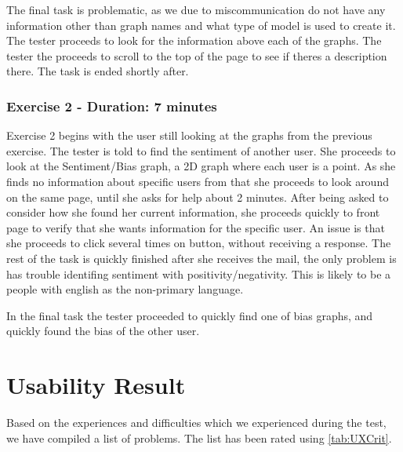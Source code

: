 The final task is problematic, as we due to miscommunication do not have any
information other than graph names and what type of model is used to create it.
The tester proceeds to look for the information above each of the graphs. The
tester the proceeds to scroll to the top of the page to see if theres a
description there. The task is ended shortly after.

\subsubsection{Exercise 2 - Duration: 7 minutes}
Exercise 2 begins with the user still looking at the graphs from the previous
exercise. The tester is told to find the sentiment of another user. She proceeds
to look at the Sentiment/Bias graph, a 2D graph where each user is a point. As
she finds no information about specific users from that she proceeds to look
around on the same page, until she asks for help about 2 minutes. After being
asked to consider how she found her current information, she proceeds quickly to
front page to verify that she wants information for the specific user. An issue
is that she proceeds to click several times on button, without receiving a
response. The rest of the task is quickly finished after she receives the mail,
the only problem is has trouble identifing sentiment with
positivity/negativity. This is likely to be a people with english as the
non-primary language.\nl

In the final task the tester proceeded to quickly find one of bias graphs, and
quickly found the bias of the other user.

\section{Usability Result}\label{sec:UXUR}
Based on the experiences and difficulties which we experienced during the test,
we have compiled a list of problems. The list has been rated using
\autoref{tab:UXCrit}.

